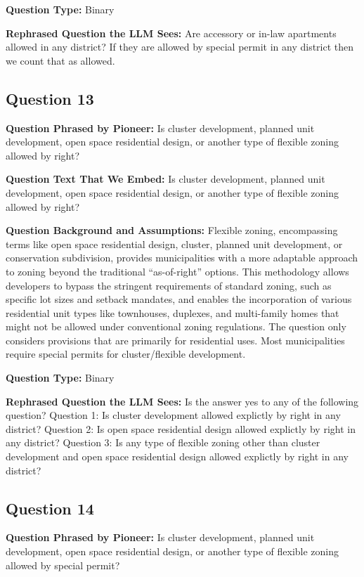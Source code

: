 \noindent\textbf{Question Type:} Binary

\noindent\textbf{Rephrased Question the LLM Sees:} Are accessory or in-law apartments allowed in any district? If they are allowed by special permit in any district then we count that as allowed.

\vspace{1cm}
\subsection*{Question 13}
\noindent\textbf{Question Phrased by Pioneer:} Is cluster development, planned unit development, open space residential design, or another type of flexible zoning allowed by right?

\noindent\textbf{Question Text That We Embed:} Is cluster development, planned unit development, open space residential design, or another type of flexible zoning allowed by right?

\noindent\textbf{Question Background and Assumptions:} Flexible zoning, encompassing terms like open space residential design, cluster, planned unit development, or conservation subdivision, provides municipalities with a more adaptable approach to zoning beyond the traditional “as-of-right” options. This methodology allows developers to bypass the stringent requirements of standard zoning, such as specific lot sizes and setback mandates, and enables the incorporation of various residential unit types like townhouses, duplexes, and multi-family homes that might not be allowed under conventional zoning regulations. The question only considers provisions that are primarily for residential uses. Most municipalities require special permits for cluster/flexible development.

\noindent\textbf{Question Type:} Binary

\noindent\textbf{Rephrased Question the LLM Sees:} Is the answer yes to any of the following question?
Question 1: Is cluster development allowed explictly by right in any district?
Question 2: Is open space residential design allowed explictly by right in any district?
Question 3: Is any type of flexible zoning other than cluster development and open space residential design allowed explictly by right in any district?

\vspace{1cm}
\subsection*{Question 14}
\noindent\textbf{Question Phrased by Pioneer:} Is cluster development, planned unit development, open space residential design, or another type of flexible zoning allowed by special permit?

